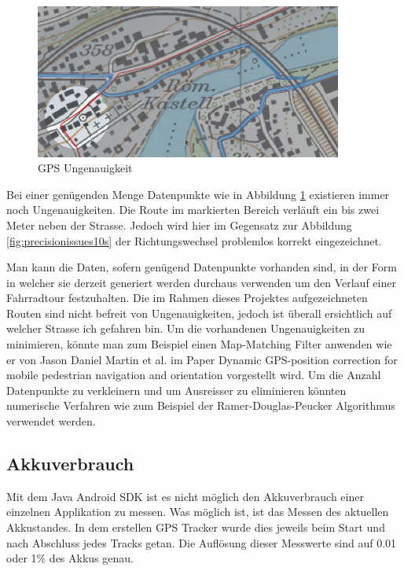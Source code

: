 \begin{figure}[h]
  \centering
  \includegraphics[width=0.9\textwidth]{images/map_issues_1s.png}
  \caption[GPS Ungenauigkeit]{GPS Ungenauigkeit}
  \label{fig:precisionissues1s}
\end{figure}

Bei einer genügenden Menge Datenpunkte wie in Abbildung \ref{fig:precisionissues1s} existieren immer noch Ungenauigkeiten. Die Route im markierten Bereich verläuft ein bis zwei Meter neben der Strasse. Jedoch wird hier im Gegensatz zur Abbildung \ref{fig:precisionissues10s} der Richtungswechsel problemlos korrekt eingezeichnet.

Man kann die Daten, sofern genügend Datenpunkte vorhanden sind, in der Form in welcher sie derzeit generiert werden durchaus verwenden um den Verlauf einer Fahrradtour festzuhalten. Die im Rahmen dieses Projektes aufgezeichneten Routen sind nicht befreit von Ungenauigkeiten, jedoch ist überall ersichtlich auf welcher Strasse ich gefahren bin. Um die vorhandenen Ungenauigkeiten zu minimieren, könnte man zum Beispiel einen  Map-Matching Filter anwenden wie er von Jason Daniel Martin et al. im Paper Dynamic GPS-position correction for mobile pedestrian navigation and orientation \cite{gpscorrection} vorgestellt wird. Um die Anzahl Datenpunkte zu verkleinern und um Ausreisser zu eliminieren könnten numerische Verfahren wie zum Beispiel der Ramer-Douglas-Peucker Algorithmus \cite{ramer}\cite{douglaspeucker} verwendet werden.

\subsection{Akkuverbrauch}
\label{subsec:analysebatteryusage}
Mit dem Java Android SDK ist es nicht möglich den Akkuverbrauch einer einzelnen Applikation zu messen. Was möglich ist, ist das Messen des aktuellen Akkustandes. In dem erstellen GPS Tracker wurde dies jeweils beim Start und nach Abschluss jedes Tracks getan. Die Auflösung dieser Messwerte sind auf 0.01 oder 1\% des Akkus genau.

